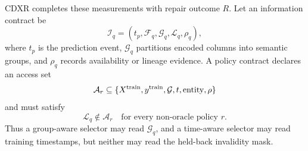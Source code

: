 \documentclass[sigconf,review]{acmart}
\begin{document}
CDXR completes these measurements with repair outcome $R$. Let an information
contract be
\begin{equation}
 \mathcal{I}_q=(t_p,\mathcal{F}_q,\mathcal{G}_q,
 \mathcal{L}_q,\rho_q),
 \label{eq:information-contract}
\end{equation}
where $t_p$ is the prediction event, $\mathcal{G}_q$ partitions encoded
columns into semantic groups, and $\rho_q$ records availability or lineage
evidence. A policy contract declares an access set
\begin{equation}
 \mathcal{A}_r\subseteq
 \{X^{\rm train},y^{\rm train},\mathcal{G},t,\mathrm{entity},\rho\}
 \label{eq:access-set}
\end{equation}
and must satisfy
\begin{equation}
 \mathcal{L}_q\notin\mathcal{A}_r
 \quad\text{for every non-oracle policy }r.
 \label{eq:oracle-isolation}
\end{equation}
Thus a group-aware selector may read $\mathcal{G}_q$, and a time-aware selector
may read training timestamps, but neither may read the held-back invalidity
mask.
\end{document}
